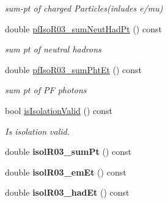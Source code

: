 \begin{DoxyCompactItemize}
\begin{DoxyCompactList}\small\item\em sum-\/pt of charged Particles(inludes e/mu) \end{DoxyCompactList}\item 
\hypertarget{classran_1_1NtMuon_ad7f4522d5f19de0f6009204fc86b5035}{double \hyperlink{classran_1_1NtMuon_ad7f4522d5f19de0f6009204fc86b5035}{pf\-Iso\-R03\-\_\-sum\-Neut\-Had\-Pt} () const }\label{classran_1_1NtMuon_ad7f4522d5f19de0f6009204fc86b5035}

\begin{DoxyCompactList}\small\item\em sum pt of neutral hadrons \end{DoxyCompactList}\item 
\hypertarget{classran_1_1NtMuon_ac68315b6c5e92ab672b6d3592a1a5bc0}{double \hyperlink{classran_1_1NtMuon_ac68315b6c5e92ab672b6d3592a1a5bc0}{pf\-Iso\-R03\-\_\-sum\-Pht\-Et} () const }\label{classran_1_1NtMuon_ac68315b6c5e92ab672b6d3592a1a5bc0}

\begin{DoxyCompactList}\small\item\em sum pt of P\-F photons \end{DoxyCompactList}\item 
\hypertarget{classran_1_1NtMuon_a604415764367bc7635a9be200109deba}{bool \hyperlink{classran_1_1NtMuon_a604415764367bc7635a9be200109deba}{is\-Isolation\-Valid} () const }\label{classran_1_1NtMuon_a604415764367bc7635a9be200109deba}

\begin{DoxyCompactList}\small\item\em Is isolation valid. \end{DoxyCompactList}\item 
\hypertarget{classran_1_1NtMuon_afc8b2c7596fc44d0faa73fb0ecaad0fc}{double {\bfseries isol\-R03\-\_\-sum\-Pt} () const }\label{classran_1_1NtMuon_afc8b2c7596fc44d0faa73fb0ecaad0fc}

\item 
\hypertarget{classran_1_1NtMuon_a280e066cdfea832c19118c9688613c13}{double {\bfseries isol\-R03\-\_\-em\-Et} () const }\label{classran_1_1NtMuon_a280e066cdfea832c19118c9688613c13}

\item 
\hypertarget{classran_1_1NtMuon_a7f6fcc9fa3bfc571ed148cd4f0ada25e}{double {\bfseries isol\-R03\-\_\-had\-Et} () const }\label{classran_1_1NtMuon_a7f6fcc9fa3bfc571ed148cd4f0ada25e}


\end{DoxyCompactItemize}

